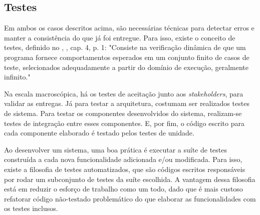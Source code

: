 \subsection{Testes}
Em ambos os casos descritos acima, são necessárias técnicas para detectar erros e manter a consistência do que já foi entregue. Para isso, existe o conceito de testes, definido no \citeauthor{ieeecomputersociety2014}, \citeyear{ieeecomputersociety2014}, cap. 4, p. 1: "Consiste na verificação dinâmica de que um programa fornece comportamentos esperados em um conjunto finito de casos de teste, selecionados adequadamente a partir do domínio de execução, geralmente infinito."

Na escala macroscópica, há os testes de aceitação junto aos \textit{stakeholders}, para validar as entregas. Já para testar a arquitetura, costumam ser realizados testes de sistema. Para testar os componentes desenvolvidos do sistema, realizam-se testes de integração entre esses componentes. E, por fim, o código escrito para cada componente elaborado é testado pelos testes de unidade.

Ao desenvolver um sistema, uma boa prática é executar a suíte de testes construída a cada nova funcionalidade adicionada e/ou modificada. Para isso, existe a filosofia de testes automatizados, que são códigos escritos responsáveis por rodar um subconjunto de testes da suíte escolhida. A vantagem dessa filosofia está em reduzir o esforço de trabalho como um todo, dado que é mais custoso refatorar código não-testado problemático do que elaborar as funcionalidades com os testes inclusos\cite[cap. ~3, p. 19-21]{gerardmeszaros2007}.
